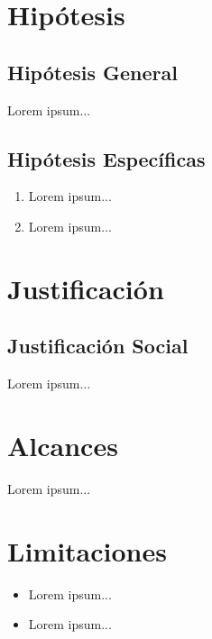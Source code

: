\section{Hipótesis}

\subsection{Hipótesis General}

Lorem ipsum...

\subsection{Hipótesis Específicas}

\begin{enumerate}
	\item Lorem ipsum...
	\item Lorem ipsum...
\end{enumerate}

\section{Justificación}

\subsection{Justificación Social}

Lorem ipsum...

\section{Alcances}

Lorem ipsum...

\section{Limitaciones}

\begin{itemize}
	\item Lorem ipsum...
	
	\item Lorem ipsum...
\end{itemize}

